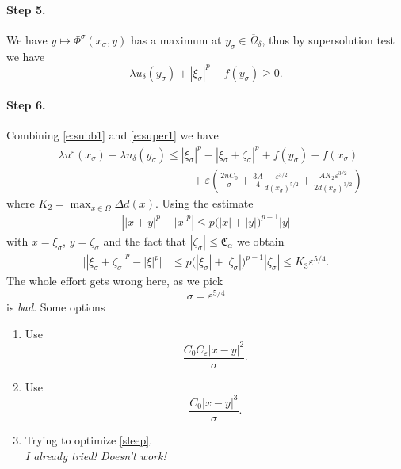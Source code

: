 \documentclass[11pt,reqno]{amsart}
\numberwithin{figure}{section}
\theoremstyle{plain}
\theoremstyle{remark}
\numberwithin{equation}{section}
\begin{document}
\paragraph{Step 5.} We have $y\mapsto \Phi^\sigma(x_\sigma,y)$ has a maximum at $y_\sigma\in \overline{\Omega}_\delta$, thus by supersolution test we have 
\begin{equation}\label{e:super1}
    \lambda u_\delta(y_\sigma) + \left|\xi_\sigma\right|^p - f(y_\sigma) \geq 0.
\end{equation}

\paragraph{Step 6.} Combining \eqref{e:subb1} and \eqref{e:super1} we have
\begin{align}
    &\lambda u^\varepsilon(x_\sigma) - \lambda u_\delta(y_\sigma) \leq |\xi_\sigma|^p - |\xi_\sigma+\zeta_\sigma|^p + f(y_\sigma) - f(x_\sigma) \nonumber \\
    & \qquad\qquad\qquad\qquad\qquad\qquad + \varepsilon \left(\frac{2nC_0}{\sigma} + \frac{3A}{4}\frac{\varepsilon^{3/2}}{d(x_\sigma)^{5/2}} + \frac{AK_2\varepsilon^{3/2}}{2d(x_\sigma)^{3/2}}\right) 
\end{align}
where $K_2 = \max_{x\in \overline{\Omega}}\Delta d(x)$. Using the estimate
\begin{align*}
    \left||x+y|^p - |x|^p \right| \leq  p\big(|x|+|y|\big)^{p-1}|y|
\end{align*}
with $x = \xi_\sigma$, $y = \zeta_\sigma$ and the fact that $|\zeta_\sigma|\leq \mathfrak{C}_\alpha$ we obtain
\begin{align}
    \Big||\xi_\sigma+\zeta_\sigma|^p - |\xi|^p\Big| &\leq p\Big(|\xi_\sigma|+|\zeta_\sigma|\Big)^{p-1}|\zeta_\sigma| \leq K_3\varepsilon ^{5/4}.\label{e:est2}
\end{align}
The whole effort gets wrong here, as we pick 
\begin{equation*}
    \sigma = \varepsilon^{5/4}
\end{equation*}
is \emph{bad}. Some options
\begin{enumerate}
    \item Use 
    \begin{equation*}
        \frac{C_0C_\varepsilon|x-y|^2}{\sigma}.
    \end{equation*}
    \item Use 
    \begin{equation*}
        \frac{C_0|x-y|^3}{\sigma}.
    \end{equation*}
    \item Trying to optimize \eqref{sleep}.\\ \emph{I already tried! Doesn't work!}
\end{enumerate}

{}
%

\end{document}
